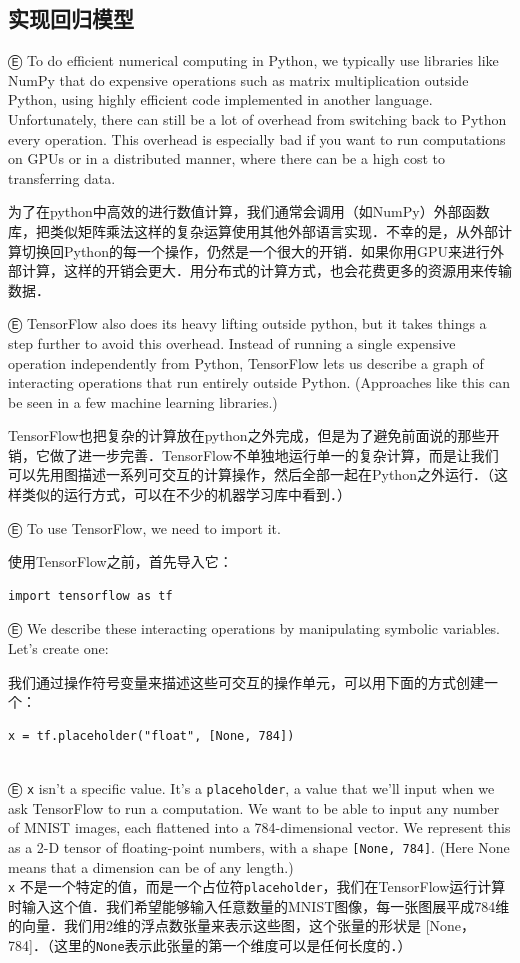 \subsection {实现回归模型}
Ⓔ To do efficient numerical computing in Python, we typically use libraries like NumPy that do expensive operations such as matrix multiplication outside Python, using highly efficient code implemented in another language. Unfortunately, there can still be a lot of overhead from switching back to Python every operation. This overhead is especially bad if you want to run computations on GPUs or in a distributed manner, where there can be a high cost to transferring data.

为了在python中高效的进行数值计算，我们通常会调用（如NumPy）外部函数库，把类似矩阵乘法这样的复杂运算使用其他外部语言实现．不幸的是，从外部计算切换回Python的每一个操作，仍然是一个很大的开销．如果你用GPU来进行外部计算，这样的开销会更大．用分布式的计算方式，也会花费更多的资源用来传输数据．

Ⓔ TensorFlow also does its heavy lifting outside python, but it takes things a step further to avoid this overhead. Instead of running a single expensive operation independently from Python, TensorFlow lets us describe a graph of interacting operations that run entirely outside Python. (Approaches like this can be seen in a few machine learning libraries.)

TensorFlow也把复杂的计算放在python之外完成，但是为了避免前面说的那些开销，它做了进一步完善．TensorFlow不单独地运行单一的复杂计算，而是让我们可以先用图描述一系列可交互的计算操作，然后全部一起在Python之外运行．（这样类似的运行方式，可以在不少的机器学习库中看到．）


Ⓔ To use TensorFlow, we need to import it.

使用TensorFlow之前，首先导入它：

\begin{lstlisting}
import tensorflow as tf
\end{lstlisting}

Ⓔ We describe these interacting operations by manipulating symbolic variables. Let's create one:

我们通过操作符号变量来描述这些可交互的操作单元，可以用下面的方式创建一个：

\begin{lstlisting}
x = tf.placeholder("float", [None, 784])
\end{lstlisting}\\
Ⓔ \lstinline{x} isn't a specific value. It's a \lstinline{placeholder}, a value that we'll input when we ask TensorFlow to run a computation. We want to be able to input any number of MNIST images, each flattened into a 784-dimensional vector. We represent this as a 2-D tensor of floating-point numbers, with a shape \lstinline{[None, 784]}. (Here None means that a dimension can be of any length.)\\
\lstinline{x} 不是一个特定的值，而是一个占位符\lstinline{placeholder}，我们在TensorFlow运行计算时输入这个值．我们希望能够输入任意数量的MNIST图像，每一张图展平成784维的向量．我们用2维的浮点数张量来表示这些图，这个张量的形状是 [None，784]．（这里的\lstinline{None}表示此张量的第一个维度可以是任何长度的．）


